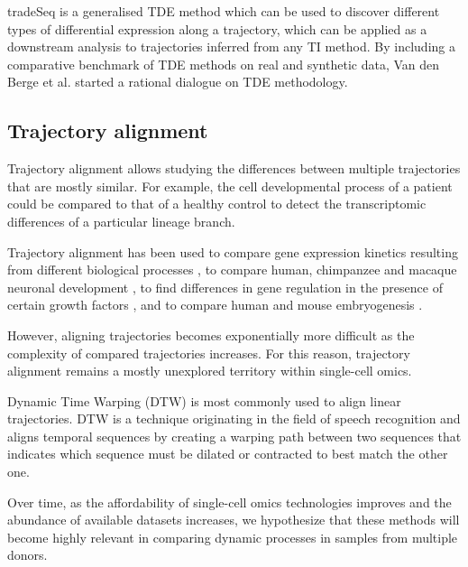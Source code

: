 tradeSeq \cite{vandenberge_trajectorybaseddifferentialexpression_2019} is a generalised TDE method which can be used to discover different types of differential expression along a trajectory, which can be applied as a downstream analysis to trajectories inferred from any TI method. By including a comparative benchmark of TDE methods on real and synthetic data, Van den Berge et al. started a rational dialogue on TDE methodology.

\subsection{Trajectory alignment}
Trajectory alignment allows studying the differences between multiple trajectories that are mostly similar. For example, the cell developmental process of a patient could be compared to that of a healthy control to detect the transcriptomic differences of a particular lineage branch. 

Trajectory alignment has been used to compare gene expression kinetics resulting from different biological processes \cite{cacchiarelli_aligningsinglecelldevelopmental_2018}, to compare human, chimpanzee and macaque neuronal development \cite{kanton_organoidsinglecellgenomic_2019}, to find differences in gene regulation in the presence of certain growth factors \cite{mcfaline-figueroa_pooledsinglecellgenetic_2019}, and to compare human and mouse embryogenesis \cite{alpert_alignmentsinglecelltrajectories_2018}.

However, aligning trajectories becomes exponentially more difficult as the complexity of compared trajectories increases. For this reason, trajectory alignment remains a mostly unexplored territory within single-cell omics.

Dynamic Time Warping (DTW) \cite{giorgino_computingvisualizingdynamic_2009} is most commonly used to align linear trajectories. DTW is a technique originating in the field of speech recognition and aligns temporal sequences by creating a warping path between two sequences that indicates which sequence must be dilated or contracted to best match the other one.

Over time, as the affordability of single-cell omics technologies improves and the abundance of available datasets increases, we hypothesize that these methods will become highly relevant in comparing dynamic processes in samples from multiple donors.

